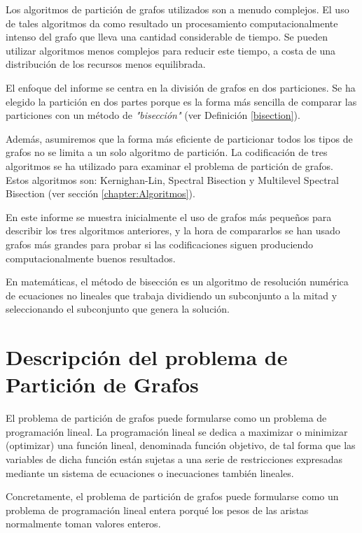 Los algoritmos de partición de grafos utilizados son a menudo complejos. El uso de tales algoritmos da como resultado un procesamiento computacionalmente intenso del grafo que lleva una cantidad considerable de tiempo. Se pueden utilizar algoritmos menos complejos para reducir este tiempo, a costa de una distribución de los recursos menos equilibrada.

El enfoque del informe se centra en la división de grafos en dos particiones. Se ha elegido la partición en dos partes porque es la forma más sencilla de comparar las particiones con un método de \textit{"bisección"} (ver Definición \ref{bisection}). 

Además, asumiremos que la forma más eficiente de particionar todos los tipos de grafos no se limita a un solo algoritmo de partición. La codificación de tres algoritmos se ha utilizado para examinar el problema de partición de grafos. Estos algoritmos son: Kernighan-Lin, Spectral Bisection y Multilevel Spectral Bisection (ver sección \ref{chapter:Algoritmos}).

En este informe se muestra inicialmente el uso de grafos más pequeños para describir los tres algoritmos anteriores, y la hora de compararlos se han usado grafos más grandes para probar si las codificaciones siguen produciendo computacionalmente buenos resultados.

\begin{mydef}\label{bisection}
	En matemáticas, el método de bisección es un algoritmo de resolución numérica de ecuaciones no lineales que trabaja dividiendo un subconjunto a la mitad y seleccionando el subconjunto que genera la solución. 
\end{mydef}

\newpage
\section{Descripción del problema de Partición de Grafos}

El problema de partición de grafos puede formularse como un problema de programación lineal. La programación lineal se dedica a maximizar o minimizar (optimizar) una función lineal, denominada función objetivo, de tal forma que las variables de dicha función están sujetas a una serie de restricciones expresadas mediante un sistema de ecuaciones o inecuaciones también lineales. 

Concretamente, el problema de partición de grafos puede formularse como un problema de programación lineal entera porqué los pesos de las aristas normalmente toman valores enteros. 

